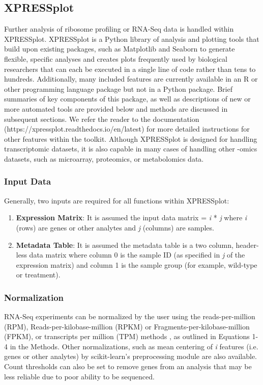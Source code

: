\documentclass[10pt, oneside]{article}
\begin{document}
\subsection{XPRESSplot}
Further analysis of ribosome profiling or RNA-Seq data is handled within XPRESSplot. XPRESSplot is a Python library of analysis and plotting tools that build upon existing packages, such as Matplotlib \cite{matplotlib} and Seaborn \cite{seaborn} to generate flexible, specific analyses and creates plots frequently used by biological researchers that can each be executed in a single line of code rather than tens to hundreds. Additionally, many included features are currently available in an R or other programming language package but not in a Python package. Brief summaries of key components of this package, as well as descriptions of new or more automated tools are provided below and methods are discussed in subsequent sections. We refer the reader to the documentation (https://xpressplot.readthedocs.io/en/latest) for more detailed instructions for other features within the toolkit. Although XPRESSplot is designed for handling transcriptomic datasets, it is also capable in many cases of handling other -omics datasets, such as microarray, proteomics, or metabolomics data.

\subsubsection{Input Data}
Generally, two inputs are required for all functions within XPRESSplot:

\begin{enumerate}
  \item \textbf{Expression Matrix}: It is assumed the input data matrix = \textit{i} * \textit{j} where \textit{i} (rows) are genes or other analytes and \textit{j} (columns) are samples.
  \item \textbf{Metadata Table}: It is assumed the metadata table is a two column, header-less data matrix where column 0 is the sample ID (as specified in \textit{j} of the expression matrix) and column 1 is the sample group (for example, wild-type or treatment).
\end{enumerate}

\subsubsection{Normalization}
RNA-Seq experiments can be normalized by the user using the reads-per-million (RPM), Reads-per-kilobase-million (RPKM) or Fragments-per-kilobase-million (FPKM), or transcripts per million (TPM) methods \cite{evans_briefbio}, as outlined in Equations 1-4 in the Methods. Other normalizations, such as mean centering of \textit{i} features (i.e. genes or other analytes) by scikit-learn's preprocessing module \cite{scikit_learn} are also available. Count thresholds can also be set to remove genes from an analysis that may be less reliable due to poor ability to be sequenced.
\end{document}
